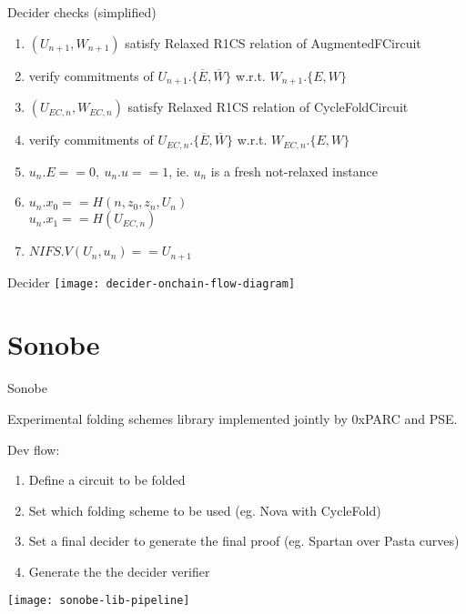 \documentclass[t]{beamer}
\begin{document}
\begin{frame}{Decider}
  checks (simplified)
  \begin{enumerate}
    \item $(U_{n+1}, W_{n+1})$ satisfy Relaxed R1CS relation of AugmentedFCircuit
    \item verify commitments of $U_{n+1}.\{\overline{E}, \overline{W}\}$ w.r.t. $W_{n+1}.\{E,W\}$
    \item $(U_{EC,n}, W_{EC,n})$ satisfy Relaxed R1CS relation of CycleFoldCircuit
    \item verify commitments of $U_{EC,n}.\{\overline{E}, \overline{W}\}$ w.r.t. $W_{EC,n}.\{E,W\}$
    \item $u_n.E==0,~ u_n.u==1$, ie. $u_n$ is a fresh not-relaxed instance
    \item $u_n.x_0==H(n, z_0, z_n, U_n)$\\
          $u_n.x_1==H(U_{EC,n})$
    \item $NIFS.V(U_n, u_n)==U_{n+1}$
  \end{enumerate}

\end{frame}

\begin{frame}{Decider}
  \texttt{[image: decider-onchain-flow-diagram]}
\end{frame}

\section{Sonobe}
\begin{frame}{Sonobe}
  \footnotesize{
  Experimental folding schemes library implemented jointly by 0xPARC and PSE.

  \vspace{0.3cm}

  Dev flow:
  \begin{enumerate}
    \item Define a circuit to be folded
    \item Set which folding scheme to be used (eg. Nova with CycleFold)
    \item Set a final decider to generate the final proof (eg. Spartan over Pasta curves)
    \item Generate the the decider verifier
  \end{enumerate}
  }

  \vspace{1cm}

  \texttt{[image: sonobe-lib-pipeline]}
\end{frame}
\end{document}
